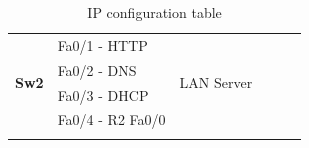 \documentclass[11pt,a4paper]{report}
\begin{document}
\begin{center}
\begin{longtable}{@{}llllll@{}}
            \multirow{4}{*}{\textbf{Sw2}}                      & Fa0/1 - HTTP                                             & \multirow{4}{*}{LAN Server}                           & \multicolumn{3}{c}{}                                                                                                                                                 \\* \cmidrule(lr){2-2}
                                                               & Fa0/2 - DNS                                              &                                                       & \multicolumn{3}{c}{}                                                                                                                                                 \\* \cmidrule(lr){2-2}
                                                               & Fa0/3 - DHCP                                             &                                                       & \multicolumn{3}{c}{}                                                                                                                                                 \\* \cmidrule(lr){2-2}
                                                               & Fa0/4 - R2 Fa0/0                                         &                                                       & \multicolumn{3}{c}{}                                                                                                                                                 \\* \bottomrule
            \caption{IP configuration table}
            \label{tab:deviceiptable}\\
            \end{longtable}
        \end{center}


\end{document}
